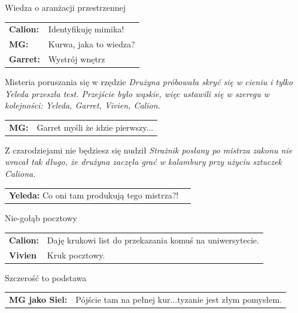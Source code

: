 \documentclass[10pt,twoside,twocolumn]{book}
\begin{document}
\begin{rpg-quotebox}{Wiedza o aranżacji przestrzennej}
   \begin{tabularx}{\columnwidth}{lX}
      \textbf{Calion:} & Identyfikuję mimika! \\
      \textbf{MG:} & Kurwa, jaka to wiedza? \\
      \textbf{Garret:} & Wystrój wnętrz\\
   \end{tabularx}
\end{rpg-quotebox}


\begin{rpg-quotebox}{Misteria poruszania się w rzędzie}
   \textit{Drużyna próbowała skryć się w cieniu i tylko Yeleda przeszła test. Przejście było wąskie, więc ustawili się w szeregu w kolejności: Yeleda, Garret, Vivien, Calion.} \\

   \begin{tabularx}{\columnwidth}{lX}
      \textbf{MG:} & Garret myśli że idzie pierwszy... \\
   \end{tabularx}
\end{rpg-quotebox}


\begin{rpg-quotebox}{Z czarodziejami nie będziesz się nudził}
   \textit{Strażnik posłany po mistrza zakonu nie wracał tak długo, że drużyna zaczęła grać w kalambury przy użyciu sztuczek Caliona.} \\

   \begin{tabularx}{\columnwidth}{lX}
      \textbf{Yeleda:} Co oni tam produkują tego mistrza?! 
   \end{tabularx}
\end{rpg-quotebox}


\begin{rpg-quotebox}{Nie-gołąb pocztowy}
   \begin{tabularx}{\columnwidth}{lX}
      \textbf{Calion:} & Daję krukowi list do przekazania komuś na uniwersytecie. \\
      \textbf{Vivien} & Kruk pocztowy.\\
   \end{tabularx}
\end{rpg-quotebox}


\begin{rpg-quotebox}{Szczerość to podstawa}
   \begin{tabularx}{\columnwidth}{lX}
      \textbf{MG jako Siel:} & Pójście tam na pełnej kur...tyzanie jest złym pomysłem. \\
   \end{tabularx}
\end{rpg-quotebox}
\end{document}
